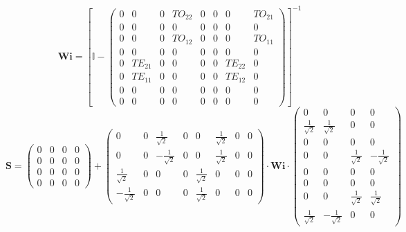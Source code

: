 \[ \mathbf{Wi} =  \left[ \mathbb{I}  - \left(\begin{array}{cccccccc} 0
& 0 & 0 & TO_{22} & 0 & 0 & 0 & TO_{21} \\ 0 & 0 & 0 & 0 & 0 & 0 & 0 &
0 \\ 0 & 0 & 0 & TO_{12} & 0 & 0 & 0 & TO_{11} \\ 0 & 0 & 0 & 0 & 0 &
0 & 0 & 0 \\ 0 & TE_{21} & 0 & 0 & 0 & 0 & TE_{22} & 0 \\ 0 & TE_{11}
& 0 & 0 & 0 & 0 & TE_{12} & 0 \\ 0 & 0 & 0 & 0 & 0 & 0 & 0 & 0 \\ 0 &
0 & 0 & 0 & 0 & 0 & 0 & 0 \end{array}\right) \right]^{-1}  \]
\[ \mathbf{S} = \left(\begin{array}{cccc} 0 & 0 & 0 & 0 \\ 0 & 0 & 0 &
0 \\ 0 & 0 & 0 & 0 \\ 0 & 0 & 0 & 0 \end{array}\right) +
\left(\begin{array}{cccccccc} 0 & 0 & \frac{1}{\sqrt{2}} & 0 & 0 &
\frac{1}{\sqrt{2}} & 0 & 0 \\ 0 & 0 & -\frac{1}{\sqrt{2}} & 0 & 0 &
\frac{1}{\sqrt{2}} & 0 & 0 \\ \frac{1}{\sqrt{2}} & 0 & 0 & 0 &
\frac{1}{\sqrt{2}} & 0 & 0 & 0 \\ -\frac{1}{\sqrt{2}} & 0 & 0 & 0 &
\frac{1}{\sqrt{2}} & 0 & 0 & 0 \end{array}\right) \cdot \mathbf{Wi}
\cdot\left(\begin{array}{cccc} 0 & 0 & 0 & 0 \\ \frac{1}{\sqrt{2}} &
\frac{1}{\sqrt{2}} & 0 & 0 \\ 0 & 0 & 0 & 0 \\ 0 & 0 &
\frac{1}{\sqrt{2}} & -\frac{1}{\sqrt{2}} \\ 0 & 0 & 0 & 0 \\ 0 & 0 & 0
& 0 \\ 0 & 0 & \frac{1}{\sqrt{2}} & \frac{1}{\sqrt{2}} \\
\frac{1}{\sqrt{2}} & -\frac{1}{\sqrt{2}} & 0 & 0 \end{array}\right) \]
